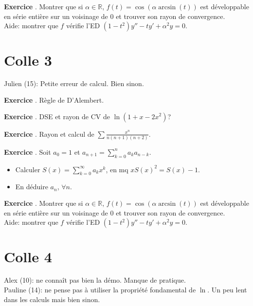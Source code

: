 \documentclass[10pt,a4paper]{article}
\newcounter{question}
\newcounter{exo}
\newenvironment{exo}{\vspace{0.5cm}\setcounter{question}{0}\addtocounter{exo}{1} \noindent \textbf{Exercice \theexo}. \normalsize }{\par}
\begin{document}
	\begin{exo}
		Montrer que si $\alpha \in \mathbb{R}$, $f(t) =\cos(\alpha \arcsin(t))$ est développable en série entière sur un voisinage de 0 et trouver son rayon de convergence.\\
		Aide: montrer que $f$ vérifie l'ED $(1 - t^2) y'' - t y' + \alpha^2 y = 0$.
	\end{exo}
	
	\section*{Colle 3}
	\setcounter{exo}{0}
	Julien (15): Petite erreur de calcul. Bien sinon.\\
	
	\begin{exo}
		Règle de D'Alembert.
	\end{exo}
	
	\begin{exo}
		DSE et rayon de CV de $\ln(1 + x - 2x^2)$?
	\end{exo}
	\begin{exo}
		Rayon et calcul de $\sum \frac{x^n}{n(n+1)(n+2)}$.
	\end{exo}

	\begin{exo}
		Soit $a_0 = 1$ et $a_{n+1} = \sum_{k=0}^{n} a_k a_{n-k}$.
		\begin{itemize}
			\item Calculer $S(x) = \sum_{k=0}^{\infty} a_k x^k$, en mq $xS(x)^2 = S(x) - 1$.
			\item En déduire $a_n$, $\forall n$.
		\end{itemize}
	\end{exo}

	\begin{exo}
		Montrer que si $\alpha \in \mathbb{R}$, $f(t) =\cos(\alpha \arcsin(t))$ est développable en série entière sur un voisinage de 0 et trouver son rayon de convergence.\\
		Aide: montrer que $f$ vérifie l'ED $(1 - t^2) y'' - t y' + \alpha^2 y = 0$.
	\end{exo}
		
	\section*{Colle 4}
	\setcounter{exo}{0}
	Alex (10): ne connaît pas bien la démo. Manque de pratique.\\
	Pauline (14): ne pense pas à utiliser la propriété fondamental de $\ln$. Un peu lent dans les calculs mais bien sinon.\\
\end{document}
